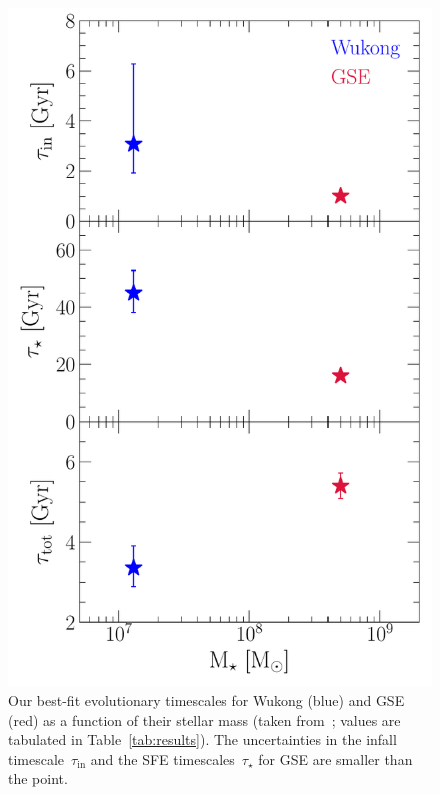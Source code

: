 \documentclass[ms.tex]{subfiles}
\begin{document}
\begin{figure}
\centering
\includegraphics[scale = 0.6]{gse_wukong_timescales.pdf}
\caption{
Our best-fit evolutionary timescales for Wukong (blue) and GSE (red) as a
function of their stellar mass (taken from~\citealt{Naidu2022}; values are
tabulated in Table~\ref{tab:results}).
The uncertainties in the infall timescale~$\tau_\text{in}$ and the SFE
timescales~$\tau_\star$ for GSE are smaller than the point.
}
\label{fig:gse_wukong_timescales}
\end{figure}
\end{document}
